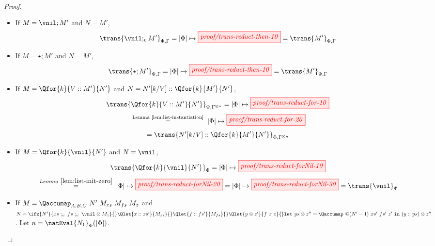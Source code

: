 \begin{proof}
\begin{itemize}
\begin{itemize}
                    \[
                        \trans{\ifz{L}{M'}{N'}}_{\Phi,\Gamma}
                        =
                        |\Phi|\mapsto\tikzfig{proof/trans-reduct-ifz-10}
                    \]
                    \[
                        \;\overset{\scriptstyle{Lemma~\ref{lem:list-init-zero}}}{=}\;
                        |\Phi|\mapsto\tikzfig{proof/trans-reduct-ifz-20}
                    \]
                    \[
                        \;\overset{\scriptstyle{\bf{(\emptyset 4)}}}{=}\;
                        |\Phi|\mapsto\tikzfig{proof/trans-reduct-ifz-30}
                        =
                        \trans{M'}_{\Phi,\Gamma}
                    \]
                \item The case where $L>0$ and $N = N'$ is symmetric to the case above.
            \end{itemize}
        \item If $M = \vnil;M'$ and $N=M'$,
            \[
                \trans{\vnil;_v M'}_{\Phi,\Gamma}
                =
                |\Phi|\mapsto\tikzfig{proof/trans-reduct-then-10}
                =
                \trans{M'}_{\Phi,\Gamma}
            \]
        \item If $M = \star;M'$ and $N=M'$,
            \[
                \trans{\star;M'}_{\Phi,\Gamma}
                =
                |\Phi|\mapsto\tikzfig{proof/trans-reduct-then-10}
                =
                \trans{M'}_{\Phi,\Gamma}
            \]
        \item If $M = \Qfor{k}{V :: M'}{N'}$ and $N=N'[k/V]::\Qfor{k}{M'}{N'}$,
            \[
                \trans{\Qfor{k}{V :: M'}{N'}}_{\Phi,\Gamma^{\otimes n}}
                =
                |\Phi|\mapsto\tikzfig{proof/trans-reduct-for-10}
            \]
            \[
                \;\overset{\scriptstyle{\text{Lemma~\ref{lem:list-instantiation}}}}{=}\;
                |\Phi|\mapsto\tikzfig{proof/trans-reduct-for-20}
            \]
            \[
                =
                \trans{N'[k/V]::\Qfor{k}{M'}{N'}}_{\Phi,\Gamma^{\otimes n}}
            \]
        \item If $M = \Qfor{k}{\vnil}{N'}$ and $N=\vnil$,
            \[
                \trans{\Qfor{k}{\vnil}{N'}}_{\Phi}
                =
                |\Phi|\mapsto\tikzfig{proof/trans-reduct-forNil-10}
            \]
            \[
                \;\overset{\scriptstyle{Lemma~\ref{lem:list-init-zero}}}{=}\;
                |\Phi|\mapsto\tikzfig{proof/trans-reduct-forNil-20}
                =
                |\Phi|\mapsto\tikzfig{proof/trans-reduct-forNil-30}
                =
                \trans{\vnil}_{\Phi}
            \]
        \item If $M = \Qaccumap_{A,B,C}\ N'\ M_{xs}\ M_{fs}\ M_{z}$ and \(N=
                \ifz{N'}{xs\ ;_v\ fs\ ;_v\ \vnil\otimes M_z}{}$\\
                $\Qlet{x :: xs'}{M_{xs}}{} \Qlet{f :: fs'}{M_{fs}}{}
                \Qlet{y\otimes z'}{f\ x\ z}{}
                \mathtt{let\ } ys \otimes z'' = \Qaccumap\ @(N'-1)\ xs'\ fs'\ z'
                \mathtt{\ in\ } (y :: ys) \otimes z''
            \). Let $n = \natEval{N_1}_\Phi(|\Phi|)$.


\end{itemize}
\end{proof}
